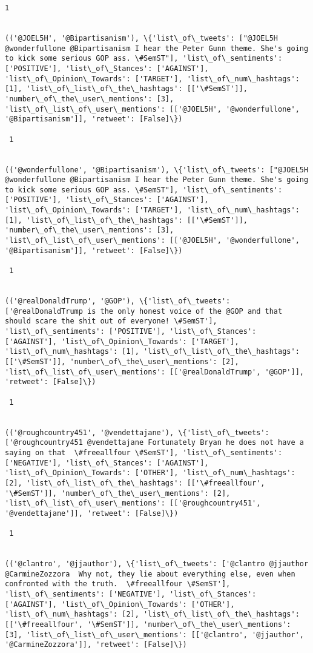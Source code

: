 \documentclass[11pt]{article}
\begin{document}
\begin{Verbatim}[commandchars=\\\{\}]
 1
 

(('@JOEL5H', '@Bipartisanism'), \{'list\_of\_tweets': ["@JOEL5H @wonderfullone @Bipartisanism I hear the Peter Gunn theme. She's going to kick some serious GOP ass. \#SemST"], 'list\_of\_sentiments': ['POSITIVE'], 'list\_of\_Stances': ['AGAINST'], 'list\_of\_Opinion\_Towards': ['TARGET'], 'list\_of\_num\_hashtags': [1], 'list\_of\_list\_of\_the\_hashtags': [['\#SemST']], 'number\_of\_the\_user\_mentions': [3], 'list\_of\_list\_of\_user\_mentions': [['@JOEL5H', '@wonderfullone', '@Bipartisanism']], 'retweet': [False]\})

 1
 

(('@wonderfullone', '@Bipartisanism'), \{'list\_of\_tweets': ["@JOEL5H @wonderfullone @Bipartisanism I hear the Peter Gunn theme. She's going to kick some serious GOP ass. \#SemST"], 'list\_of\_sentiments': ['POSITIVE'], 'list\_of\_Stances': ['AGAINST'], 'list\_of\_Opinion\_Towards': ['TARGET'], 'list\_of\_num\_hashtags': [1], 'list\_of\_list\_of\_the\_hashtags': [['\#SemST']], 'number\_of\_the\_user\_mentions': [3], 'list\_of\_list\_of\_user\_mentions': [['@JOEL5H', '@wonderfullone', '@Bipartisanism']], 'retweet': [False]\})

 1
 

(('@realDonaldTrump', '@GOP'), \{'list\_of\_tweets': ['@realDonaldTrump is the only honest voice of the @GOP and that should scare the shit out of everyone! \#SemST'], 'list\_of\_sentiments': ['POSITIVE'], 'list\_of\_Stances': ['AGAINST'], 'list\_of\_Opinion\_Towards': ['TARGET'], 'list\_of\_num\_hashtags': [1], 'list\_of\_list\_of\_the\_hashtags': [['\#SemST']], 'number\_of\_the\_user\_mentions': [2], 'list\_of\_list\_of\_user\_mentions': [['@realDonaldTrump', '@GOP']], 'retweet': [False]\})

 1
 

(('@roughcountry451', '@vendettajane'), \{'list\_of\_tweets': ['@roughcountry451 @vendettajane Fortunately Bryan he does not have a saying on that  \#freeallfour \#SemST'], 'list\_of\_sentiments': ['NEGATIVE'], 'list\_of\_Stances': ['AGAINST'], 'list\_of\_Opinion\_Towards': ['OTHER'], 'list\_of\_num\_hashtags': [2], 'list\_of\_list\_of\_the\_hashtags': [['\#freeallfour', '\#SemST']], 'number\_of\_the\_user\_mentions': [2], 'list\_of\_list\_of\_user\_mentions': [['@roughcountry451', '@vendettajane']], 'retweet': [False]\})

 1
 

(('@clantro', '@jjauthor'), \{'list\_of\_tweets': ['@clantro @jjauthor @CarmineZozzora  Why not, they lie about everything else, even when confronted with the truth.  \#freeallfour \#SemST'], 'list\_of\_sentiments': ['NEGATIVE'], 'list\_of\_Stances': ['AGAINST'], 'list\_of\_Opinion\_Towards': ['OTHER'], 'list\_of\_num\_hashtags': [2], 'list\_of\_list\_of\_the\_hashtags': [['\#freeallfour', '\#SemST']], 'number\_of\_the\_user\_mentions': [3], 'list\_of\_list\_of\_user\_mentions': [['@clantro', '@jjauthor', '@CarmineZozzora']], 'retweet': [False]\})


\end{Verbatim}
\end{document}
